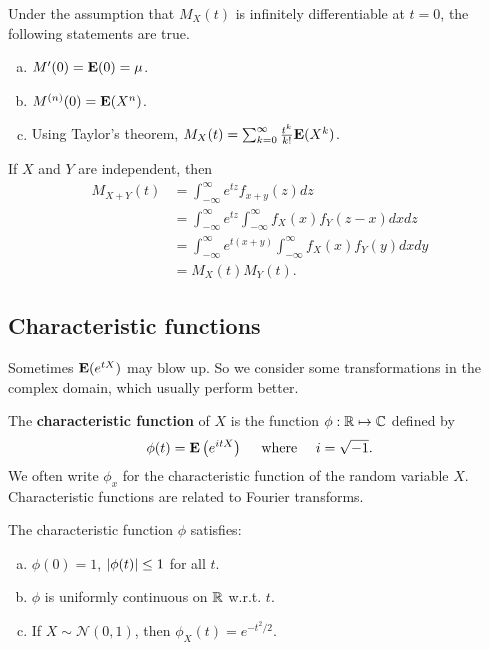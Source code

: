 Under the assumption that $M_X(t)$ is infinitely differentiable at $t=0$, the following statements are true. 
\begin{enumerate}[(a)]
    \item $M^\prime(0) = \mathbf{E}(0) = \mu$.
    \item $M^{(n)}(0) = \mathbf{E}(X^n)$.
    \item Using Taylor's theorem, $M_X(t) = \sum_{k=0}^\infty \frac{t^k}{k!} \mathbf{E}(X^k)$.
\end{enumerate}

\begin{theorem}
If $X$ and $Y$ are independent, then
\begin{equation*}
    \begin{split}
        M_{X+Y}(t) &= \int_{-\infty}^\infty e^{tz} f_{x+y}(z) dz \\
        &= \int_{-\infty}^\infty e^{tz} \int_{-\infty}^\infty f_X(x) f_Y(z-x) dx dz \\
        &= \int_{-\infty}^\infty e^{t(x+y)} \int_{-\infty}^\infty f_X(x) f_Y(y) dx dy \\
        &= M_X(t) M_Y(t).
    \end{split}
\end{equation*}
\end{theorem}

\subsection{Characteristic functions}
Sometimes $\mathbf{E}(e^{tX})$ may blow up. So we consider some transformations in the complex domain, which usually perform better.

\begin{definition}
The \textbf{characteristic function} of $X$ is the function $\phi: \mathbb{R} \mapsto \mathbb{C}$ defined by
\begin{equation*}
    \phi(t)=\mathbf{E}\left(e^{i t X}\right) \quad \text { where } \quad i=\sqrt{-1}.
\end{equation*}
We often write $\phi_x$ for the characteristic function of the random variable $X$. Characteristic functions are related to Fourier transforms. 
\end{definition}

\begin{theorem}
The characteristic function $\phi$ satisfies:
\begin{enumerate}[(a)]
    \item $\phi(0) = 1$, $\left\vert \phi(t) \right\vert \leq 1$ for all $t$.
    \item $\phi$ is uniformly continuous on $\mathbb{R}$ w.r.t. $t$.
    \item If $X \sim \mathcal{N}(0,1)$, then $\phi_{X}(t) = e^{-t^2/2}$.
\end{enumerate}
\end{theorem}

